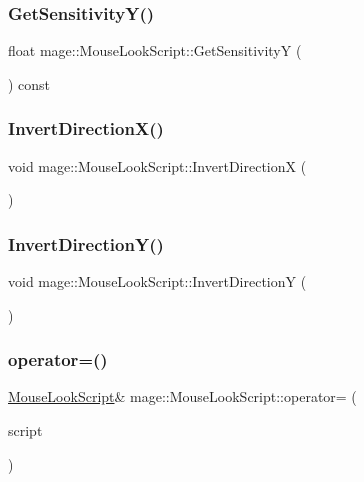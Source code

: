 \subsubsection{\texorpdfstring{Get\+Sensitivity\+Y()}{GetSensitivityY()}}
{\footnotesize\ttfamily float mage\+::\+Mouse\+Look\+Script\+::\+Get\+SensitivityY (\begin{DoxyParamCaption}{ }\end{DoxyParamCaption}) const}

\hypertarget{classmage_1_1_mouse_look_script_a3e68c097c150cb2f779a7cca1a3c82d5}{}\label{classmage_1_1_mouse_look_script_a3e68c097c150cb2f779a7cca1a3c82d5} 
\subsubsection{\texorpdfstring{Invert\+Direction\+X()}{InvertDirectionX()}}
{\footnotesize\ttfamily void mage\+::\+Mouse\+Look\+Script\+::\+Invert\+DirectionX (\begin{DoxyParamCaption}{ }\end{DoxyParamCaption})}

\hypertarget{classmage_1_1_mouse_look_script_a6f0296eceb11425ca02a9fbc19847904}{}\label{classmage_1_1_mouse_look_script_a6f0296eceb11425ca02a9fbc19847904} 
\subsubsection{\texorpdfstring{Invert\+Direction\+Y()}{InvertDirectionY()}}
{\footnotesize\ttfamily void mage\+::\+Mouse\+Look\+Script\+::\+Invert\+DirectionY (\begin{DoxyParamCaption}{ }\end{DoxyParamCaption})}

\hypertarget{classmage_1_1_mouse_look_script_a13fba7e90bf10d24814e0a8cec25645e}{}\label{classmage_1_1_mouse_look_script_a13fba7e90bf10d24814e0a8cec25645e} 
\subsubsection{\texorpdfstring{operator=()}{operator=()}\hspace{0.1cm}{\footnotesize\ttfamily [1/2]}}
{\footnotesize\ttfamily \hyperlink{classmage_1_1_mouse_look_script}{Mouse\+Look\+Script}\& mage\+::\+Mouse\+Look\+Script\+::operator= (\begin{DoxyParamCaption}\item[{const \hyperlink{classmage_1_1_mouse_look_script}{Mouse\+Look\+Script} \&}]{script }\end{DoxyParamCaption})\hspace{0.3cm}{\ttfamily [delete]}}

